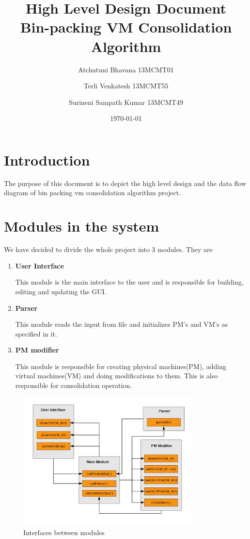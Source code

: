 \documentclass[a4paper,11pt]{article}
\title{High Level Design Document \\ Bin-packing VM Consolidation Algorithm}
\author{Atchutuni Bhavana 13MCMT01 \and Terli Venkatesh 13MCMT55 \and Surineni Sampath Kumar 13MCMT49}
\date{\today}
\begin{document}
\maketitle
\pagebreak
\tableofcontents
\pagebreak 

\section{Introduction}
The purpose of this document is to depict the high level
design and the data flow diagram of bin packing
vm consolidation algorithm project.
\section{Modules in the system}
We have decided to divide the whole project into 3 modules. They are
\begin{enumerate}
\item \textbf{ User Interface }

This module is the main interface to the user and  is responsible for building, editing and updating the GUI.
\item \textbf{ Parser }

This module reads the input from file and initializes PM’s and VM’s as specified in it.
\item \textbf{ PM modifier }

This module is responsible for creating physical machines(PM), adding virtual machines(VM) and doing modifications to them. This is also responsible for consolidation operation.  

\end{enumerate}

\begin{figure}[h]
\centering
\includegraphics[height=7cm]{images/intrfc.jpg}
\caption{Interfaces between modules}
\label{fig:interfaces}

\end{figure}
\end{document}
